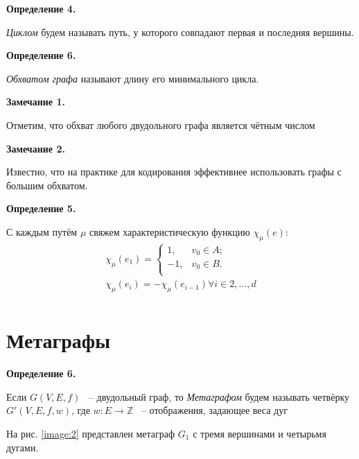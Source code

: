 \documentclass[14pt]{mmcs-article}
\begin{document}
\textbf{Определение 4.}

\textsl{Циклом} будем называть путь, у которого совпадают первая и последняя вершины.

\textbf{Определение 6.}

\textsl{Обхватом графа} называют длину его минимального цикла.

\textbf{Замечание 1.}

Отметим, что обхват любого двудольного графа является чётным числом


\textbf{Замечание 2.}

Известно, что на практике для кодирования эффективнее использовать графы с большим обхватом.

\textbf{Определение 5.}


С каждым путём $\mu$ свяжем характеристическую функцию $\chi_\mu(e)$:
\[
    \begin{array}{ll}
        \chi_{\mu}(e_1) = \left\{
            \begin{array}{ll}
            1,  & v_0 \in A;\\
            -1, & v_0 \in B. \\
            \end{array}
        \right. \\
        \chi_\mu(e_i) = -\chi_\mu(e_{i-1}) \forall i \in 2, ..., d\\
    \end{array}
\]

\pagebreak
\section*{Метаграфы}

\textbf{Определение 6.}

Если $G(V,E,f)$ ~-- двудольный граф, то \textsl{Метаграфом} будем называть четвёрку $G'(V,E,f,w)$, где $w: E \to \mathbb{Z}$ ~-- отображения, задающее веса дуг

На рис. \ref{image:2} представлен метаграф  $G_1$ с тремя вершинами и четырьмя дугами.
\end{document}
